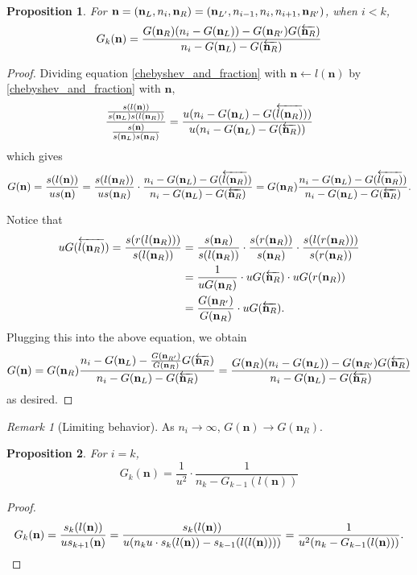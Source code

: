 \documentclass{article}
\theoremstyle{definition}
\theoremstyle{plain}
\newtheorem{proposition}{Proposition}[section]
\theoremstyle{remark}
\newtheorem*{remark}{Remark}
\numberwithin{equation}{section}
\begin{document}
\begin{proposition}\label{fraction_recurrence}
  For $\mathbf{n} = (\mathbf{n}_L, n_i, \mathbf{n}_R)
  = (\mathbf{n}_{L'}, n_{i-1}, n_i, n_{i+1}, \mathbf{n}_{R'})$, when $i < k$,
  \[
    G_k(\mathbf{n}) = \frac{
      G(\mathbf{n}_R) (n_i - G(\mathbf{n}_L)) - G(\mathbf{n}_{R'}) G(\overleftarrow{\mathbf{n}_R})}{ n_i - G(\mathbf{n}_L) - G(\overleftarrow{\mathbf{n}_R}) }
  \]
\end{proposition}
\begin{proof}
  Dividing equation \eqref{chebyshev_and_fraction} with $\mathbf{n} \leftarrow l(\mathbf{n})$
  by \eqref{chebyshev_and_fraction} with $\mathbf{n}$,
  \[
    \frac{ \frac{s(l(\mathbf{n}))}{s(\mathbf{n}_L) s(l(\mathbf{n}_R))} }{ \frac{s(\mathbf{n})}{s(\mathbf{n}_L) s(\mathbf{n}_R)} }
    = \frac{ u (n_i - G(\mathbf{n}_L) - G(\overleftarrow{l(\mathbf{n}_R)})) }{ u (n_i - G(\mathbf{n}_L) - G(\overleftarrow{\mathbf{n}_R})) }
  \]
  which gives
  \[
    G(\mathbf{n}) = \frac{s(l(\mathbf{n}))}{u s(\mathbf{n})}
    = \frac{s(l(\mathbf{n}_R))}{u s(\mathbf{n}_R)} \cdot \frac{n_i - G(\mathbf{n}_L) - G(\overleftarrow{l(\mathbf{n}_R)})}{n_i - G(\mathbf{n}_L) - G(\overleftarrow{\mathbf{n}_R})}
    = G(\mathbf{n}_R) \frac{n_i - G(\mathbf{n}_L) - G(\overleftarrow{l(\mathbf{n}_R)})}{n_i - G(\mathbf{n}_L) - G(\overleftarrow{\mathbf{n}_R})}.
  \]

  Notice that
  \begin{align*}
    u G(\overleftarrow{l(\mathbf{n}_R)}) = \frac{s(r(l(\mathbf{n}_R)))}{s(l(\mathbf{n}_R))}
    & = \frac{s(\mathbf{n}_R)}{s(l(\mathbf{n}_R))} \cdot \frac{s(r(\mathbf{n}_R))}{s(\mathbf{n}_R)} \cdot \frac{s(l(r(\mathbf{n}_R)))}{s(r(\mathbf{n}_R))} \\
    & = \frac{1}{u G(\mathbf{n}_R)} \cdot u G(\overleftarrow{\mathbf{n}_R}) \cdot u G(r(\mathbf{n}_R)) \\
    & = \frac{G(\mathbf{n}_{R'})}{G(\mathbf{n}_R)} \cdot u G(\overleftarrow{\mathbf{n}_R}).
  \end{align*}
  Plugging this into the above equation, we obtain
  \[
    G(\mathbf{n}) = G(\mathbf{n}_R) \frac{n_i - G(\mathbf{n}_L) - \frac{G(\mathbf{n}_{R'})}{G(\mathbf{n}_R)} G(\overleftarrow{\mathbf{n}_R})}{n_i - G(\mathbf{n}_L) - G(\overleftarrow{\mathbf{n}_R})}
    = \frac{G(\mathbf{n}_R) (n_i - G(\mathbf{n}_L)) - G(\mathbf{n}_{R'}) G(\overleftarrow{\mathbf{n}_R})}{n_i - G(\mathbf{n}_L) - G(\overleftarrow{\mathbf{n}_R})}
  \]
  as desired.
\end{proof}

\begin{remark}[Limiting behavior]
  As $n_i \to \infty$, $G(\mathbf{n}) \to G(\mathbf{n}_R)$.
\end{remark}

\begin{proposition}\label{fraction_recurrence_last}
  For $i = k$,
  \[
    G_k(\mathbf{n}) = \frac{1}{u^2} \cdot \frac{1}{n_k - G_{k-1}(l(\mathbf{n}))}
  \]
\end{proposition}
\begin{proof}
  \[
    G_k(\mathbf{n}) = \frac{s_k(l(\mathbf{n}))}{u s_{k+1}(\mathbf{n})}
    = \frac{s_k(l(\mathbf{n}))}{u (n_k u \cdot s_k(l(\mathbf{n})) - s_{k-1}(l(l(\mathbf{n}))))}
    = \frac{1}{u^2 (n_k - G_{k-1}(l(\mathbf{n})))}.
  \]
\end{proof}
\end{document}
